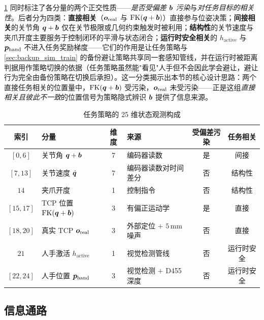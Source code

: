 \cref{tab:obs_25d} 同时标注了各分量的两个正交性质——\emph{是否受偏差 $\bm{b}$ 污染}与\emph{对任务目标的相关性}。后者分为四类：\textbf{直接相关}（$\bm{o}_\text{real}$ 与 $\text{FK}(\bm{q}+\bm{b})$）直接参与位姿决策；\textbf{间接相关}的关节角 $\bm{q}+\bm{b}$ 仅在关节极限或几何约束触发时被利用；\textbf{结构性}的关节速度与夹爪开度主要服务于控制闭环的平滑与状态闭合；\textbf{运行时安全相关}的 $h_\text{active}$ 与 $\bm{p}_\text{hand}$ 不进入任务奖励梯度——它们的作用是让任务策略与\cref{sec:backup_sim_train} 的备份避让策略共享同一套感知管线，并在运行时被距离判据用作策略切换的依据（任务策略虽然能"看见"人手但不会因此学会避让，避让行为完全由备份策略在切换后承担）。这一分类揭示出本节的核心设计思路：两个直接任务相关的位置量中，$\text{FK}(\bm{q}+\bm{b})$ 受污染，$\bm{o}_\text{real}$ 未受污染——正是这组\emph{直接相关且彼此不一致}的位置信号为策略隐式辨识 $\bm{b}$ 提供了信息来源。

\begin{table}[htbp]
  \centering
  \caption{任务策略的 25 维状态观测构成}
  \label{tab:obs_25d}
  \small
  \begin{tabular}{@{}clclcc@{}}
    \toprule
    索引 & 分量 & 维度 & 来源 & 受偏差污染 & 任务相关 \\
    \midrule
    $[0, 6]$   & 关节角 $\bm{q}+\bm{b}$ & 7 & 编码器读数 & 是 & 间接 \\
    $[7, 13]$  & 关节速度 $\dot{\bm{q}}$ & 7 & 编码器读数对时间差分 & 否 & 结构性 \\
    $14$       & 夹爪开度 & 1 & 控制指令 & 否 & 结构性 \\
    $[15, 17]$ & TCP 位置 $\text{FK}(\bm{q}+\bm{b})$ & 3 & 有偏正运动学 & 是 & 直接 \\
    $[18, 20]$ & 真实 TCP $\bm{o}_\text{real}$ & 3 & 外部定位 $+$ $5$\,mm 噪声 & 否 & 直接 \\
    $21$       & 人手激活 $h_\text{active}$ & 1 & 视觉检测管线 & 否 & 运行时安全 \\
    $[22, 24]$ & 人手位置 $\bm{p}_\text{hand}$ & 3 & 视觉检测 $+$ D455 深度 & 否 & 运行时安全 \\
    \bottomrule
  \end{tabular}
\end{table}

\subsection{信息通路}\label{subsec:obs_dataflow}

